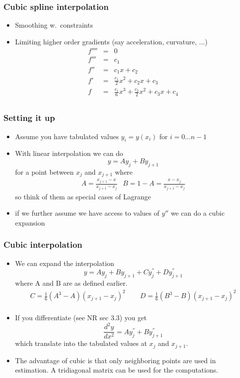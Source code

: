 \documentclass[10pt]{beamer}
\begin{document}
\begin{frame}
  \frametitle{Cubic spline interpolation}
  \begin{itemize}
  \item Smoothing w.\ constraints
  \item Limiting higher order gradients (say acceleration, curvature, ...)
    \[
      \begin{array}{lll}
        f'''' & = & 0\\
        f'''  & = & c_1\\
        f''   & = & c_1 x + c_2\\
        f'    & = & \frac{c_1}{2} x^2 + c_2 x + c_ 3\\
        f     & = & \frac{c_1}{6} x^3 + \frac{c_2}{2} x^2 + c_3 x + c_4\\
      \end{array}
    \]
  \end{itemize}
\end{frame}
\begin{frame}
  \frametitle{Setting it up}
  \begin{itemize}
  \item Assume you have tabulated values $y_i = y(x_i)$ for $i = 0 \ldots n-1$
  \item With linear interpolation we can do
    \[
      y = A y_j + B y_{j+1}
    \] for a point between $x_j$ and $x_{j+1}$ where
    \[
      \begin{array}{ll}
        A = \frac{x_{j+1} - x}{x_{j+1}-x_j} & B = 1-A = \frac{x - x_j}{x_{j+1} - x_j}
      \end{array}
    \] so think of them as special cases of Lagrange
  \item if we further assume we have access to values of $y''$ we can do a cubic expansion
  \end{itemize}
\end{frame}

\begin{frame}
  \frametitle{Cubic interpolation}
  \begin{itemize}
  \item We can expand the interpolation
    \[
      y = A y_j + B y_{j+1} + C y^{''}_j + D y^{''}_{j+1}
    \]
    where A and B are as defined earlier.
    \[
      \begin{array}{cc}
        C = \frac{1}{6} (A^3-A)(x_{j+1} - x_j)^2 ~~~ & ~~~
        D = \frac{1}{6} (B^3-B)(x_{j+1} - x_j)^2\\
      \end{array}
    \]
  \item If you differentiate (see NR sec 3.3) you get
    \[
      \frac{d^2y}{dx^2} = A y^{''}_j + B y^{''}_{j+1}
    \]
    which translate into the tabulated values at $x_j$ and $x_{j+1}$.
  \item The advantage of cubic is that only neighboring points are
    used in estimation. A tridiagonal matrix can be used for the
    computations.
  \end{itemize}
\end{frame}
\end{document}
